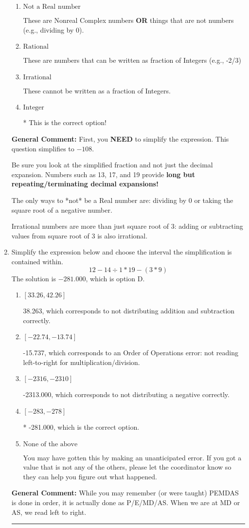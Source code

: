 \documentclass{extbook}[14pt]
\newcommand{\litem}[1]{\item #1

\rule{\textwidth}{0.4pt}}
\begin{document}
\begin{enumerate}
{\begin{enumerate}[label=\Alph*.]
These are the counting numbers with 0 (0, 1, 2, 3, ...)
\item \( \text{Not a Real number} \)

These are Nonreal Complex numbers \textbf{OR} things that are not numbers (e.g., dividing by 0).
\item \( \text{Rational} \)

These are numbers that can be written as fraction of Integers (e.g., -2/3)
\item \( \text{Irrational} \)

These cannot be written as a fraction of Integers.
\item \( \text{Integer} \)

* This is the correct option!
\end{enumerate}

\textbf{General Comment:} First, you \textbf{NEED} to simplify the expression. This question simplifies to $-108$. 
 
 Be sure you look at the simplified fraction and not just the decimal expansion. Numbers such as 13, 17, and 19 provide \textbf{long but repeating/terminating decimal expansions!} 
 
 The only ways to *not* be a Real number are: dividing by 0 or taking the square root of a negative number. 
 
 Irrational numbers are more than just square root of 3: adding or subtracting values from square root of 3 is also irrational.
}
\litem{
Simplify the expression below and choose the interval the simplification is contained within.
\[ 12 - 14 \div 1 * 19 - (3 * 9) \]The solution is \( -281.000 \), which is option D.\begin{enumerate}[label=\Alph*.]
\item \( [33.26, 42.26] \)

 38.263, which corresponds to not distributing addition and subtraction correctly.
\item \( [-22.74, -13.74] \)

 -15.737, which corresponds to an Order of Operations error: not reading left-to-right for multiplication/division.
\item \( [-2316, -2310] \)

 -2313.000, which corresponds to not distributing a negative correctly.
\item \( [-283, -278] \)

* -281.000, which is the correct option.
\item \( \text{None of the above} \)

 You may have gotten this by making an unanticipated error. If you got a value that is not any of the others, please let the coordinator know so they can help you figure out what happened.
\end{enumerate}

\textbf{General Comment:} While you may remember (or were taught) PEMDAS is done in order, it is actually done as P/E/MD/AS. When we are at MD or AS, we read left to right.
}
\end{enumerate}
\end{document}
